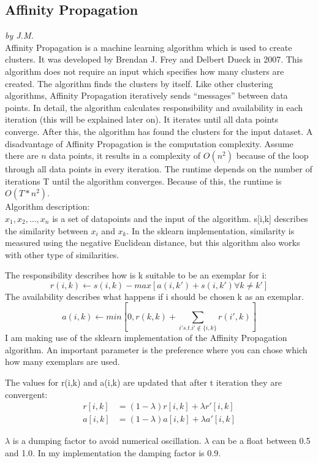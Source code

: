 \subsection{Affinity Propagation}
\textit{by J.M.}\\
	
Affinity Propagation is a machine learning algorithm which is used to create clusters. It was developed by Brendan J. Frey and Delbert Dueck in 2007. This algorithm does not require an input which specifies how many clusters are created. The algorithm finds the clusters by itself. Like other clustering algorithms, Affinity Propagation iteratively sends “messages” between data points. In detail, the algorithm calculates responsibility and availability in each iteration (this will be explained later on). It iterates until all data points converge. After this, the algorithm has found the clusters for the input dataset. A disadvantage of Affinity Propagation is the computation complexity. Assume there are $n$ data points, it results in a complexity of $O(n^2)$ because of the loop through all data points in every iteration. The runtime depends on the number of iterations T until the algorithm converges. Because of this, the runtime is $O(T* n^2)$.\\ 
Algorithm description: \\
$x_1, x_2 , \dots,  x_n$ is a set of datapoints and the input of the algorithm. s[i,k] describes the similarity between $x_i$ and $x_k$. In the \gls{sklearn} implementation, similarity is measured using the negative Euclidean distance, but this algorithm also works with other type of similarities. 

The responsibility describes how is k suitable to be an exemplar for i:
\begin{equation}
r(i,k) \leftarrow  s(i,k) - max \left [ a(i,k') + s(i, k') \forall k \neq k' \right ]
\end{equation}
The availability describes what happens if i should be chosen k as an exemplar. 
\begin{equation}
a(i,k) \leftarrow  min \left [ 0, r(k,k) +  \sum_{i' s.t. i'\notin \{i,k\}} r(i',k) \right ]
\end{equation}
I am making use of the \gls{sklearn} implementation of the Affinity Propagation algorithm. An important parameter is the preference where you can chose which how many exemplars are used. 
	
The values for r(i,k) and a(i,k) are updated that after t iteration they are convergent:
\begin{align}
r \left [ i,k \right ] &= (1-\lambda)r \left [ i,k \right ] + \lambda r' \left [ i,k \right ]\\
a \left [ i,k \right ] &= (1-\lambda)a \left [ i,k \right ] + \lambda a' \left [ i,k \right ]  
\end{align}
	
$\lambda$ is a dumping factor to avoid numerical oscillation. $\lambda$ can be a float between 0.5 and 1.0. In my implementation the damping factor is 0.9. 
	
	